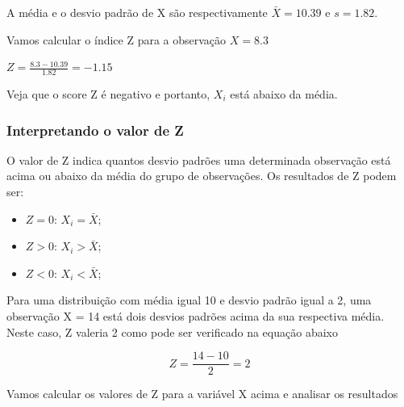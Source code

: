 \documentclass[
]{book}
\providecommand{\tightlist}{%
  \setlength{\itemsep}{0pt}\setlength{\parskip}{0pt}}
\begin{document}
A média e o desvio padrão de X são respectivamente \(\bar{X} = 10.39\) e \(s = 1.82\).

Vamos calcular o índice Z para a observação \(X = 8.3\)

\(Z = \frac{8.3 - 10.39}{1.82} = -1.15\)

Veja que o score Z é negativo e portanto, \(X_i\) está abaixo da média.

\hypertarget{interpretando-o-valor-de-z}{%
\subsubsection{Interpretando o valor de Z}\label{interpretando-o-valor-de-z}}

O valor de Z indica quantos desvio padrões uma determinada observação está acima ou abaixo da média do grupo de observações. Os resultados de Z podem ser:

\begin{itemize}
\tightlist
\item
  \(Z = 0\): \(X_i = \bar{X}\);
\item
  \(Z > 0\): \(X_i > \bar{X}\);
\item
  \(Z < 0\): \(X_i < \bar{X}\);
\end{itemize}

Para uma distribuição com média igual 10 e desvio padrão igual a 2, uma observação X = 14 está dois desvios padrões acima da sua respectiva média. Neste caso, Z valeria 2 como pode ser verificado na equação abaixo

\[Z = \frac{14 - 10}{2} = 2\]

Vamos calcular os valores de Z para a variável X acima e analisar os resultados
\end{document}
